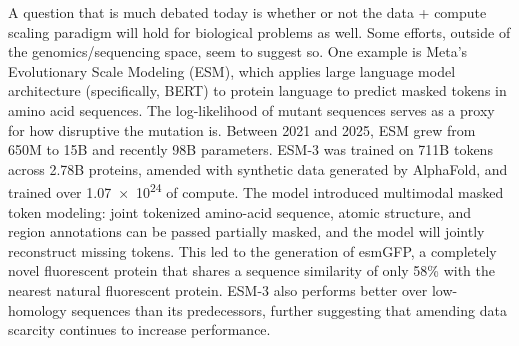 A question that is much debated today is whether or not the data + compute scaling paradigm will hold for biological problems as well. Some efforts, outside of the genomics/sequencing space, seem to suggest so. One  example is Meta's Evolutionary Scale Modeling (ESM), which applies large language model architecture (specifically, BERT) to protein language to predict masked tokens in amino acid sequences. The log-likelihood of mutant sequences serves as a proxy for how disruptive the mutation is. Between 2021 and 2025, ESM grew from 650M to 15B and recently 98B parameters. ESM-3 was trained on 711B tokens across 2.78B proteins, amended with synthetic data generated by AlphaFold, and trained over \SI{1.07e24}{\flops} of compute. The model introduced multimodal masked token modeling: joint tokenized amino-acid sequence, atomic structure, and region annotations can be passed partially masked, and the model will jointly reconstruct missing tokens. This led to the generation of esmGFP, a completely novel fluorescent protein that shares a sequence similarity of only 58\% with the nearest natural fluorescent protein. ESM-3 also performs better over low-homology sequences than its predecessors, further suggesting that amending data scarcity continues to increase performance.


